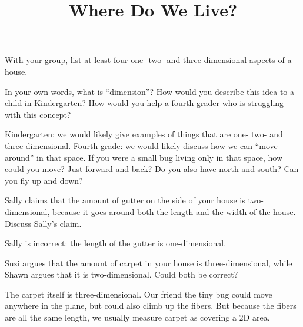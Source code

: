 \documentclass[nooutcomes,noauthor, handout]{ximera}
\title{Where Do We Live?}
\begin{document}
\begin{abstract}
\end{abstract}


\maketitle


\begin{problem}
    With your group, list at least four one- two- and three-dimensional aspects of a house.
    

    

\end{problem}

\begin{problem}
    In your own words, what is ``dimension''?  How would you describe this idea to a child in Kindergarten?  How would you help a fourth-grader who is struggling with this concept?
    
        \begin{solution}
Kindergarten: we would likely give examples of things that are one- two- and three-dimensional. Fourth grade: we would likely discuss how we can ``move around'' in that space. If you were a small bug living only in that space, how could you move? Just forward and back? Do you also have north and south? Can you fly up and down?
    \end{solution}

\end{problem}

\begin{problem}
    Sally claims that the amount of gutter on the side of your house is two-dimensional, because it goes around both the length and the width of the house.  Discuss Sally's claim.
    
    \begin{solution}
    	Sally is incorrect: the length of the gutter is one-dimensional.
    \end{solution}
\end{problem}

\begin{problem}
    Suzi argues that the amount of carpet in your house is three-dimensional, while Shawn argues that it is two-dimensional.  Could both be correct?
    
    \begin{solution}
    	The carpet itself is three-dimensional. Our friend the tiny bug could move anywhere in the plane, but could also climb up the fibers. But because the fibers are all the same length, we usually measure carpet as covering a 2D area.
    \end{solution}
\end{problem}
\end{document}
